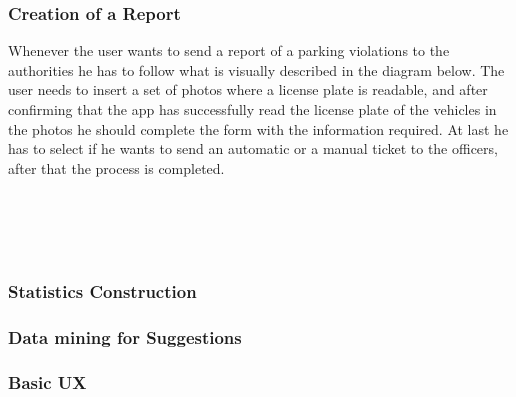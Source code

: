 \subsubsection{Creation of a Report}
Whenever the user wants to send a report of a parking violations to the authorities he has to follow what is visually described in the diagram below.
The user needs to insert a set of photos where a license plate is readable, and after confirming that the app has successfully read the license plate of the vehicles in the photos he should complete the form with the information required. At last he has to select if he wants to send an automatic or a manual ticket to the officers, after that the process is completed.
\\
\\
\\
\\
\\
\clearpage
\subsubsection{Statistics Construction}
\clearpage
\subsubsection{Data mining for Suggestions}
\clearpage
\subsubsection{Basic UX}
\clearpage